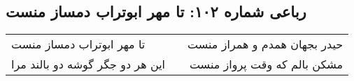 \begin{center}
\section*{رباعی شماره ۱۰۲: تا مهر ابوتراب دمساز منست}
\label{sec:sh102}
\begin{longtable}{l p{0.5cm} r}
تا مهر ابوتراب دمساز منست
&&
حیدر بجهان همدم و همراز منست
\\
این هر دو جگر گوشه دو بالند مرا
&&
مشکن بالم که وقت پرواز منست
\\
\end{longtable}
\end{center}
